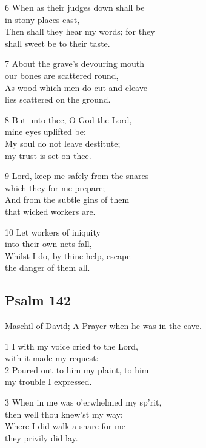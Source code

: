 6 When as their judges down shall be\\
in stony places cast,\\
Then shall they hear my words; for they\\
shall sweet be to their taste.

7 About the grave’s devouring mouth\\
our bones are scattered round,\\
As wood which men do cut and cleave\\
lies scattered on the ground.

8 But unto thee, O God the Lord,\\
mine eyes uplifted be:\\
My soul do not leave destitute;\\
my trust is set on thee.

9 Lord, keep me safely from the snares\\
which they for me prepare;\\
And from the subtle gins of them\\
that wicked workers are.

10 Let workers of iniquity\\
into their own nets fall,\\
Whilst I do, by thine help, escape\\
the danger of them all.

\begin{center}
\quad{}\quad{}
\end{center}

\subsection*{Psalm 142}

Maschil of David; A Prayer when he was in the cave.

1 I with my voice cried to the Lord,\\
with it made my request:\\
2 Poured out to him my plaint, to him\\
my trouble I expressed.

3 When in me was o’erwhelmed my sp’rit,\\
then well thou knew’st my way;\\
Where I did walk a snare for me\\
they privily did lay.

